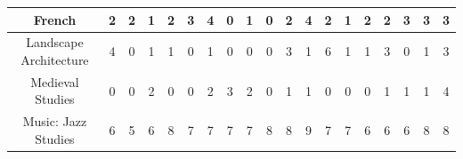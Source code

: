 \documentclass[10pt]{article}
\begin{document}
\begin{landscape}
\begin{longtable}[c]{|ccccccccccccccccccc|}
	\multicolumn{1}{|c|}{French}                                     & \multicolumn{1}{c|}{2}          & \multicolumn{1}{c|}{2}          & \multicolumn{1}{c|}{1}          & \multicolumn{1}{c|}{2}          & \multicolumn{1}{c|}{3}          & \multicolumn{1}{c|}{4}          & \multicolumn{1}{c|}{0}          & \multicolumn{1}{c|}{1}          & \multicolumn{1}{c|}{0}          & \multicolumn{1}{c|}{2}          & \multicolumn{1}{c|}{4}          & \multicolumn{1}{c|}{2}          & \multicolumn{1}{c|}{1}          & \multicolumn{1}{c|}{2}          & \multicolumn{1}{c|}{2}          & \multicolumn{1}{c|}{3}          & \multicolumn{1}{c|}{3}          & 3          \\ \hline
	\multicolumn{1}{|c|}{Landscape Architecture}                     & \multicolumn{1}{c|}{4}          & \multicolumn{1}{c|}{0}          & \multicolumn{1}{c|}{1}          & \multicolumn{1}{c|}{1}          & \multicolumn{1}{c|}{0}          & \multicolumn{1}{c|}{1}          & \multicolumn{1}{c|}{0}          & \multicolumn{1}{c|}{0}          & \multicolumn{1}{c|}{0}          & \multicolumn{1}{c|}{3}          & \multicolumn{1}{c|}{1}          & \multicolumn{1}{c|}{6}          & \multicolumn{1}{c|}{1}          & \multicolumn{1}{c|}{1}          & \multicolumn{1}{c|}{3}          & \multicolumn{1}{c|}{0}          & \multicolumn{1}{c|}{1}          & 3          \\ \hline
	\multicolumn{1}{|c|}{Medieval Studies}                           & \multicolumn{1}{c|}{0}          & \multicolumn{1}{c|}{0}          & \multicolumn{1}{c|}{2}          & \multicolumn{1}{c|}{0}          & \multicolumn{1}{c|}{0}          & \multicolumn{1}{c|}{2}          & \multicolumn{1}{c|}{3}          & \multicolumn{1}{c|}{2}          & \multicolumn{1}{c|}{0}          & \multicolumn{1}{c|}{1}          & \multicolumn{1}{c|}{1}          & \multicolumn{1}{c|}{0}          & \multicolumn{1}{c|}{0}          & \multicolumn{1}{c|}{0}          & \multicolumn{1}{c|}{1}          & \multicolumn{1}{c|}{1}          & \multicolumn{1}{c|}{1}          & 4          \\ \hline
	\multicolumn{1}{|c|}{Music: Jazz Studies}                        & \multicolumn{1}{c|}{6}          & \multicolumn{1}{c|}{5}          & \multicolumn{1}{c|}{6}          & \multicolumn{1}{c|}{8}          & \multicolumn{1}{c|}{7}          & \multicolumn{1}{c|}{7}          & \multicolumn{1}{c|}{7}          & \multicolumn{1}{c|}{7}          & \multicolumn{1}{c|}{8}          & \multicolumn{1}{c|}{8}          & \multicolumn{1}{c|}{9}          & \multicolumn{1}{c|}{7}          & \multicolumn{1}{c|}{7}          & \multicolumn{1}{c|}{6}          & \multicolumn{1}{c|}{6}          & \multicolumn{1}{c|}{6}          & \multicolumn{1}{c|}{8}          & 8          \\ \hline

\end{longtable}
\end{landscape}
\end{document}
